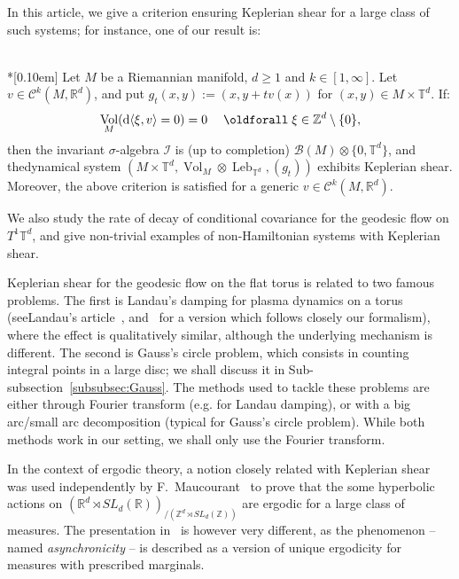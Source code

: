 \documentclass[10pt]{amsart}
\theoremstyle{definition}\newtheorem{defi}[theo]{Definition}\newtheorem{rema}[theo]{Remark}\newtheorem{exam}[theo]{Example}\newtheorem{exem}[theo]{Example}\newtheorem{nota}[theo]{Notation}
\DeclareMathOperator{\Leb}{Leb}
\DeclareMathOperator{\Vol}{Vol}
\newcommand{\Z}{\mathbb{Z}}
\newcommand{\R}{\mathbb{R}}
\newcommand{\Tbb}{\mathbb{T}}
\newcommand{\Bcal}{\mathcal{B}}
\newcommand{\Ccal}{\mathcal{C}}
\newcommand{\Ical}{\mathcal{I}}
\newcommand{\de}{{\rm d}}
\renewcommand*{\forall}{\mathrel{\oldforall}}
\begin{document}

In this article, we give a criterion ensuring Keplerian shear for a large class of such systems; for instance, one of our result is:

\begin{prop}\ \\*[0.10em]
Let $M$ be a Riemannian manifold, $d \geq 1$ and $k \in [1, \infty]$. Let $v \in \Ccal^k (M, \R^d)$, and put $g_t (x,y) := (x, y+tv(x))$ for $(x,y)\in M \times \Tbb^d$. If:
\[
\Vol_M (\de \langle \xi, v \rangle = 0) = 0 \quad \forall \xi \in \Z^d \setminus \{0\},
\]
then the invariant $\sigma$-algebra $\Ical$ is (up to completion) $\Bcal (M) \otimes \{0, \Tbb^d\}$, and the\linebreak dynamical system $(M \times \Tbb^d, \Vol_M \otimes \Leb_{\Tbb^d}, (g_t))$ exhibits Keplerian shear. Moreover, the above criterion is satisfied for a generic $v \in \Ccal^k (M, \R^d)$.
\end{prop}

We also study the rate of decay of conditional covariance for the geodesic flow on $T^1 \Tbb^d$, and give non-trivial examples of non-Hamiltonian systems with Keplerian shear.


Keplerian shear for the geodesic flow on the flat torus is related to two famous problems. The first is Landau's damping for plasma dynamics on a torus (see\linebreak Landau's article~\cite{Landau:1946}, and~\cite[Theorem~3.1]{MouhotVillani:2011} for a version which follows closely our formalism), where the effect is qualitatively similar, although the underlying mechanism is different. The second is Gauss's circle problem, which consists in counting integral points in a large disc; we shall discuss it in Sub-subsection~\ref{subsubsec:Gauss}. The methods used to tackle these problems are either through Fourier transform (e.g. for Landau damping), or with a big arc/small arc decomposition (typical for Gauss's circle problem). While both methods work in our setting, we shall only use the Fourier transform.


In the context of ergodic theory, a notion closely related with Keplerian shear was used independently by F.~Maucourant~\cite{Maucourant:2016} to prove that the some hyperbolic actions on $(\R^d \rtimes SL_d (\R))_{/(\Z^d \rtimes SL_d (\Z))}$ are ergodic for a large class of measures. The presentation in~\cite{Maucourant:2016} is however very different, as the phenomenon -- named \emph{asynchronicity} -- is described as a version of unique ergodicity for measures with prescribed marginals.
\end{document}
